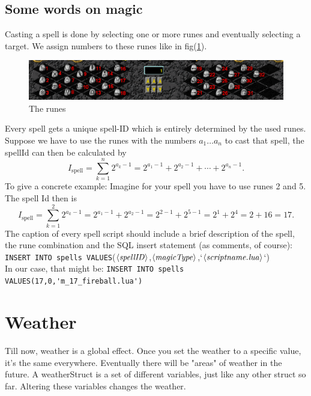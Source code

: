\documentclass[a4paper,10pt,makeidx]{scrreprt}
\newcommand{\comm}[1]{\index{#1}\texttt{#1}}
\newcommand{\var}[1]{$\left\langle \text{\emph{#1}} \right\rangle$}
\begin{document}
\section{Some words on magic}
Casting a spell is done by selecting one or more runes and eventually selecting a target. We assign numbers to these runes like in fig(\ref{runes}).
\begin{figure}[htp]
\begin{center}
\includegraphics[scale=.5]{runes.eps}
\end{center}
\caption{The runes}\label{runes}
\end{figure}
Every spell gets a unique spell-ID which is entirely determined by the used runes. Suppose we have to use the runes with the numbers $a_1 \dots a_n$ to cast that spell, the spellId can then be calculated by
\begin{equation}
  I_{\mathrm{spell}}=\sum_{k=1}^n 2^{a_k-1}=2^{a_1-1}+2^{a_2-1}+\cdots+2^{a_n-1}.
\end{equation}
To give a concrete example: Imagine for your spell you have to use runes 2 and 5. The spell Id then is
\begin{equation}
  I_{\mathrm{spell}}=\sum_{k=1}^2 2^{a_k-1}=2^{a_1-1}+2^{a_2-1}=2^{2-1}+2^{5-1}=2^1+2^4=2+16=17.
\end{equation}
The caption of every spell script should include a brief description of the spell, the rune combination and the SQL insert statement (as comments, of course):\\
   \comm{INSERT INTO spells VALUES}(\var{spellID},\var{magicType},`\var{scriptname.lua}`)\\
In our case, that might be: \verb"INSERT INTO spells VALUES(17,0,'m_17_fireball.lua')"

\chapter{Weather}
Till now, weather is a global effect. Once you set the weather to a specific value, it's the same everywhere. Eventually
there will be "areas" of weather in the future. A weatherStruct is a set of different variables, just like any other struct
so far. Altering these variables changes the weather.
\end{document}
